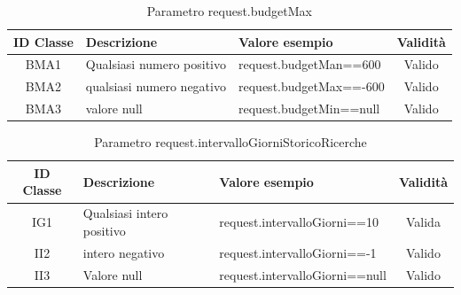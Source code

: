\begin{table}[H]
	\centering
	\begin{tabular}{|c|p{4cm}|p{5.5cm}|c|} 
		\hline
		\textbf{ID Classe} & \textbf{Descrizione} & \textbf{Valore esempio} & \textbf{Validità} \\
		\hline
		BMA1 & Qualsiasi numero positivo
		& request.budgetMan==600 & Valido \\
		\hline
		BMA2 & qualsiasi numero negativo
		& request.budgetMax==-600 & Valido \\
		\hline
		BMA3 & valore null
		& request.budgetMin==null & Valido \\
		\hline
	\end{tabular}
	\caption{Parametro request.budgetMax}
	\label{tab:parametriRequestBudgetMax}
\end{table}

\begin{table}[H]
	\centering
	\begin{tabular}{|c|p{4cm}|p{5.5cm}|c|} 
		\hline
		\textbf{ID Classe} & \textbf{Descrizione} & \textbf{Valore esempio} & \textbf{Validità} \\
		\hline
		IG1 & Qualsiasi intero positivo & request.intervalloGiorni==10 & Valida \\
		\hline
		II2 & intero negativo & request.intervalloGiorni==-1 & Valido \\
		\hline
		II3 & Valore null & request.intervalloGiorni==null & Valido \\
		\hline
	\end{tabular}
	\caption{Parametro request.intervalloGiorniStoricoRicerche}
	\label{tab:parametriRequestIntervalloGiorniStoricoRicerche}
\end{table}

\vspace{1cm}




